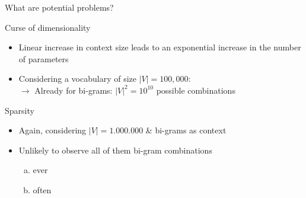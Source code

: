 
\begin{frame}{What are potential problems?}

\vfill

\begin{block}{Curse of dimensionality}
    \begin{itemize}
        \item Linear increase in context size leads to an exponential increase in the number of parameters
        \item Considering a vocabulary of size $|V| = 100,000$:\\
        $\rightarrow$ Already for bi-grams: $|V|^2 = 10^{10}$ possible combinations
    \end{itemize}
\end{block}
\begin{block}{Sparsity}
    \begin{itemize}
        \item Again, considering $|V| = 1.000.000$ \& bi-grams as context
        \item Unlikely to observe all of them bi-gram combinations
        \begin{enumerate}[(a)]
            \item ever
            \item often
        \end{enumerate}
    \end{itemize}
\end{block}

\vfill

\end{frame}



